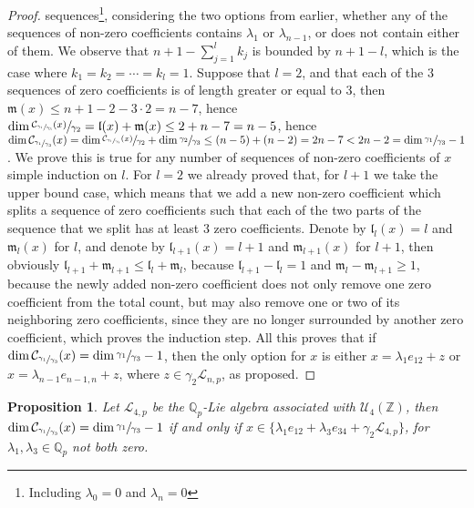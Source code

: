 \documentclass[12pt]{article}
\newtheorem{proposition}[theorem]{Proposition}
\begin{document}
\begin{proof}
sequences\footnote{Including $\lambda_0=0$ and $\lambda_n=0$}, considering the two options from earlier, whether any of the sequences of non-zero coefficients contains $\lambda_1$ or $\lambda_{n-1}$, or does not contain either of them. We observe that $n+1-\sum_{j=1}^l k_j$ is bounded by $n+1-l$, which is the case where $k_1=k_2=\cdots=k_l=1$. Suppose that $l=2$, and that each of the $3$ sequences of zero coefficients is of length greater or equal to $3$, then $\mathfrak{m}(x)\leq n+1-2-3\cdot 2=n-7$, hence $\dim\sfrac{\mathcal{C}_{\sfrac{\gamma_1}{\gamma_3}}(x)}{\gamma_2}=\mathfrak{l}(x)+\mathfrak{m}(x)\leq 2+n-7=n-5$, hence $\dim\mathcal{C}_{\sfrac{\gamma_1}{\gamma_3}}(x)=\dim\sfrac{\mathcal{C}_{\sfrac{\gamma_1}{\gamma_3}}(x)}{\gamma_2}+\dim\sfrac{\gamma_2}{\gamma_3}\leq (n-5)+(n-2)=2n-7<2n-2=\dim\sfrac{\gamma_1}{\gamma_3}-1$. We prove this is true for any number of sequences of non-zero coefficients of $x$ simple induction on $l$. For $l=2$ we already proved that, for $l+1$ we take the upper bound case, which means that we add a new non-zero coefficient which splits a sequence of zero coefficients such that each of the two parts of the sequence that we split has at least $3$ zero coefficients. Denote by $\mathfrak{l}_l(x)=l$ and $\mathfrak{m}_l(x)$ for $l$, and denote by $\mathfrak{l}_{l+1}(x)=l+1$ and $\mathfrak{m}_{l+1}(x)$ for $l+1$, then obviously $\mathfrak{l}_{l+1}+\mathfrak{m}_{l+1}\leq\mathfrak{l}_l+\mathfrak{m}_l$, because $\mathfrak{l}_{l+1}-\mathfrak{l}_l=1$ and $\mathfrak{m}_{l}-\mathfrak{m}_{l+1}\geq 1$, because the newly added non-zero coefficient does not only remove one zero coefficient from the total count, but may also remove one or two of its neighboring zero coefficients, since they are no longer surrounded by another zero coefficient, which proves the induction step. All this proves that if $\dim\mathcal{C}_{\sfrac{\gamma_1}{\gamma_3}}(x)=\dim\sfrac{\gamma_1}{\gamma_3}-1$, then the only option for $x$ is either $x=\lambda_1 e_{12}+z$ or $x=\lambda_{n-1}e_{n-1,n}+z$, where $z\in\gamma_2\mathcal{L}_{n,p}$, as proposed.
\end{proof}
\begin{proposition}
\label{prop.n.geq.4.centralizer.codimension}
Let $\mathcal{L}_{4,p}$ be the $\mathbb{Q}_p$-Lie algebra associated with $\mathcal{U}_4(\mathbb{Z})$, then $\dim\mathcal{C}_{\sfrac{\gamma_1}{\gamma_3}}(x)=\dim\sfrac{\gamma_1}{\gamma_3}-1$ if and only if $x\in\{\lambda_1 e_{12}+\lambda_3 e_{34}+\gamma_2\mathcal{L}_{4,p}\}$, for $\lambda_1,\lambda_3\in\mathbb{Q}_p$ not both zero.
\end{proposition}
\end{document}
